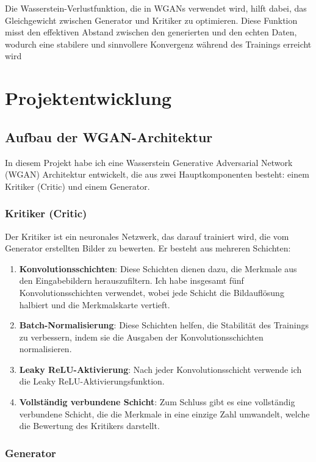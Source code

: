 \documentclass[a4paper, 12pt]{article}
\begin{document}
Die Wasserstein-Verlustfunktion, die in WGANs verwendet wird, hilft dabei, das Gleichgewicht zwischen Generator und Kritiker zu optimieren. Diese Funktion misst den effektiven Abstand zwischen den generierten und den echten Daten, wodurch eine stabilere und sinnvollere Konvergenz während des Trainings erreicht wird



\section{Projektentwicklung}
\subsection{Aufbau der WGAN-Architektur}

In diesem Projekt habe ich eine Wasserstein Generative Adversarial Network (WGAN) Architektur entwickelt, die aus zwei Hauptkomponenten besteht: einem Kritiker (Critic) und einem Generator.

\subsubsection{Kritiker (Critic)}

Der Kritiker ist ein neuronales Netzwerk, das darauf trainiert wird, die vom Generator erstellten Bilder zu bewerten. Er besteht aus mehreren Schichten:

\begin{enumerate}
    \item \textbf{Konvolutionsschichten}: Diese Schichten dienen dazu, die Merkmale aus den Eingabebildern herauszufiltern. Ich habe insgesamt fünf Konvolutionsschichten verwendet, wobei jede Schicht die Bildauflösung halbiert und die Merkmalskarte vertieft.
    \item \textbf{Batch-Normalisierung}: Diese Schichten helfen, die Stabilität des Trainings zu verbessern, indem sie die Ausgaben der Konvolutionsschichten normalisieren.
    \item \textbf{Leaky ReLU-Aktivierung}: Nach jeder Konvolutionsschicht verwende ich die Leaky ReLU-Aktivierungsfunktion.
    \item \textbf{Vollständig verbundene Schicht}: Zum Schluss gibt es eine vollständig verbundene Schicht, die die Merkmale in eine einzige Zahl umwandelt, welche die Bewertung des Kritikers darstellt.
\end{enumerate}

\subsubsection{Generator}
\end{document}

